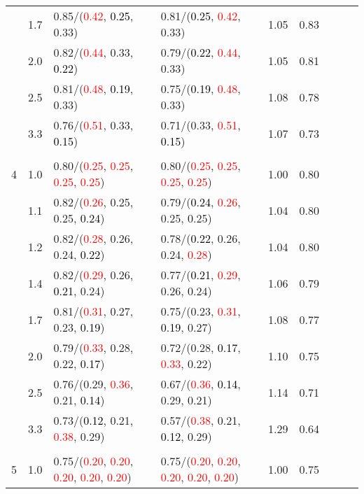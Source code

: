 \documentclass[10pt,a4paper]{report}
\begin{document}
\begin{table}[!htbp]
\begin{center}
{\begin{tabular}{ccllccccc}
			&1.7&0.85/(\textcolor{red}{0.42}, \textcolor{black}{0.25}, 0.33)&0.81/(\textcolor{black}{0.25}, \textcolor{red}{0.42}, 0.33)&1.05&0.83\\
			&2.0&0.82/(\textcolor{red}{0.44}, 0.33, \textcolor{black}{0.22})&0.79/(\textcolor{black}{0.22}, \textcolor{red}{0.44}, 0.33)&1.05&0.81\\
			&2.5&0.81/(\textcolor{red}{0.48}, \textcolor{black}{0.19}, 0.33)&0.75/(\textcolor{black}{0.19}, \textcolor{red}{0.48}, 0.33)&1.08&0.78\\
			&3.3&0.76/(\textcolor{red}{0.51}, 0.33, \textcolor{black}{0.15})&0.71/(0.33, \textcolor{red}{0.51}, \textcolor{black}{0.15})&1.07&0.73\\
			&&&&\\
			4			&1.0&0.80/(\textcolor{red}{0.25}, \textcolor{red}{0.25}, \textcolor{red}{0.25}, \textcolor{red}{0.25})&0.80/(\textcolor{red}{0.25}, \textcolor{red}{0.25}, \textcolor{red}{0.25}, \textcolor{red}{0.25})&1.00&0.80\\
			&1.1&0.82/(\textcolor{red}{0.26}, 0.25, 0.25, \textcolor{black}{0.24})&0.79/(\textcolor{black}{0.24}, \textcolor{red}{0.26}, 0.25, 0.25)&1.04&0.80\\
			&1.2&0.82/(\textcolor{red}{0.28}, 0.26, 0.24, \textcolor{black}{0.22})&0.78/(\textcolor{black}{0.22}, 0.26, 0.24, \textcolor{red}{0.28})&1.04&0.80\\
			&1.4&0.82/(\textcolor{red}{0.29}, 0.26, \textcolor{black}{0.21}, 0.24)&0.77/(\textcolor{black}{0.21}, \textcolor{red}{0.29}, 0.26, 0.24)&1.06&0.79\\
			&1.7&0.81/(\textcolor{red}{0.31}, 0.27, 0.23, \textcolor{black}{0.19})&0.75/(0.23, \textcolor{red}{0.31}, \textcolor{black}{0.19}, 0.27)&1.08&0.77\\
			&2.0&0.79/(\textcolor{red}{0.33}, 0.28, 0.22, \textcolor{black}{0.17})&0.72/(0.28, \textcolor{black}{0.17}, \textcolor{red}{0.33}, 0.22)&1.10&0.75\\
			&2.5&0.76/(0.29, \textcolor{red}{0.36}, 0.21, \textcolor{black}{0.14})&0.67/(\textcolor{red}{0.36}, \textcolor{black}{0.14}, 0.29, 0.21)&1.14&0.71\\
			&3.3&0.73/(\textcolor{black}{0.12}, 0.21, \textcolor{red}{0.38}, 0.29)&0.57/(\textcolor{red}{0.38}, 0.21, \textcolor{black}{0.12}, 0.29)&1.29&0.64\\
			&&&&\\
			5			&1.0&0.75/(\textcolor{red}{0.20}, \textcolor{red}{0.20}, \textcolor{red}{0.20}, \textcolor{red}{0.20}, \textcolor{red}{0.20})&0.75/(\textcolor{red}{0.20}, \textcolor{red}{0.20}, \textcolor{red}{0.20}, \textcolor{red}{0.20}, \textcolor{red}{0.20})&1.00&0.75\\

\end{tabular}}
\end{center}
\end{table}
\end{document}
